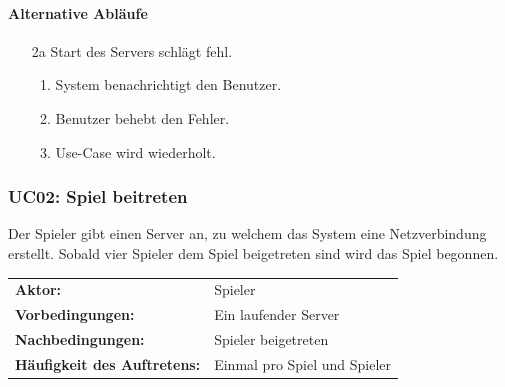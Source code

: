 \documentclass[12pt,halfparskip]{scrartcl}
\begin{document}
\paragraph{Alternative Abläufe}
\begin{enumerate}
	\item[2a] Start des Servers schlägt fehl.
	\begin{enumerate}
		\item System benachrichtigt den Benutzer.
		\item Benutzer behebt den Fehler.
		\item Use-Case wird wiederholt.
	\end{enumerate}
\end{enumerate}

\subsubsection{UC02: Spiel beitreten}\label{ssub:uc02_spiel_beitreten}
Der Spieler gibt einen Server an, zu welchem das System eine Netzverbindung erstellt. Sobald vier Spieler dem Spiel beigetreten sind wird das Spiel begonnen.

\begin{tabular}{@{} l l @{}}
	\textbf{Aktor:}											&	Spieler \\
	\textbf{Vorbedingungen:}						& Ein laufender Server \\
	\textbf{Nachbedingungen:}						& Spieler beigetreten \\
	\textbf{Häufigkeit des Auftretens:}	& Einmal pro Spiel und Spieler \\
\end{tabular}

\vspace{0.5cm}
\end{document}
